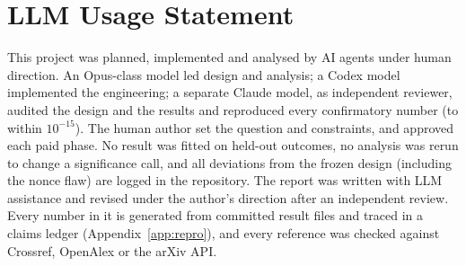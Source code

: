 \documentclass[11pt,letterpaper]{article}
\begin{document}
\section*{LLM Usage Statement}
This project was planned, implemented and analysed by AI agents under human direction. An Opus-class model led design
and analysis; a Codex model implemented the engineering; a separate Claude model, as independent reviewer, audited the
design and the results and reproduced every confirmatory number (to within $10^{-15}$). The human author set the
question and constraints, and approved each paid phase. No result was
fitted on held-out outcomes, no analysis was rerun to change a significance call, and all deviations from the frozen
design (including the nonce flaw) are logged in the repository.
The report was written with LLM assistance and revised under the author's direction after an independent review. Every number in it is generated
from committed result files and traced in a claims ledger (Appendix~\ref{app:repro}), and every reference was checked
against Crossref, OpenAlex or the arXiv API.
\end{document}
